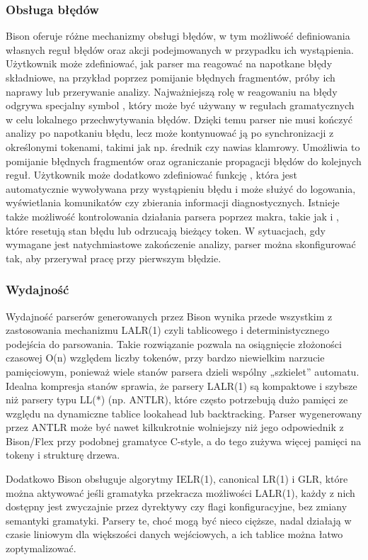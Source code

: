 \documentclass[12pt,twoside]{article}
\begin{document}
\subsubsection{Obsługa błędów}
Bison oferuje różne mechanizmy obsługi błędów, w tym możliwość definiowania własnych reguł błędów oraz akcji podejmowanych w przypadku ich wystąpienia. Użytkownik może zdefiniować, jak parser ma reagować na napotkane błędy składniowe, na przykład poprzez pomijanie błędnych fragmentów, próby ich naprawy lub przerywanie analizy.
Najważniejszą rolę w reagowaniu na błędy odgrywa specjalny symbol , który może być używany w regułach gramatycznych w celu lokalnego przechwytywania błędów. Dzięki temu parser nie musi kończyć analizy po napotkaniu błędu, lecz może kontynuować ją po synchronizacji z określonymi tokenami, takimi jak np. średnik czy nawias klamrowy. Umożliwia to pomijanie błędnych fragmentów oraz ograniczanie propagacji błędów do kolejnych reguł. Użytkownik może dodatkowo zdefiniować funkcję , która jest automatycznie wywoływana przy wystąpieniu błędu i może służyć do logowania, wyświetlania komunikatów czy zbierania informacji diagnostycznych. Istnieje także możliwość kontrolowania działania parsera poprzez makra, takie jak  i , które resetują stan błędu lub odrzucają bieżący token. W sytuacjach, gdy wymagane jest natychmiastowe zakończenie analizy, parser można skonfigurować tak, aby przerywał pracę przy pierwszym błędzie. 

\subsubsection{Wydajność}
Wydajność parserów generowanych przez Bison wynika przede wszystkim z zastosowania mechanizmu LALR(1) czyli tablicowego i deterministycznego podejścia do parsowania. Takie rozwiązanie pozwala na osiągnięcie złożoności czasowej O(n) względem liczby tokenów, przy bardzo niewielkim narzucie pamięciowym, ponieważ wiele stanów parsera dzieli wspólny „szkielet” automatu. Idealna kompresja stanów sprawia, że parsery LALR(1) są kompaktowe i szybsze niż parsery typu LL(*) (np. ANTLR), które często potrzebują dużo pamięci ze względu na dynamiczne tablice lookahead lub backtracking. Parser wygenerowany przez ANTLR może być nawet kilkukrotnie wolniejszy niż jego odpowiednik z Bison/Flex przy podobnej gramatyce C-style, a do tego zużywa więcej pamięci na tokeny i strukturę drzewa. 

Dodatkowo Bison obsługuje algorytmy IELR(1), canonical LR(1) i GLR, które można aktywować jeśli gramatyka przekracza możliwości LALR(1), każdy z nich dostępny  jest zwyczajnie przez dyrektywy  czy flagi konfiguracyjne, bez zmiany semantyki gramatyki. Parsery te, choć mogą być nieco cięższe, nadal działają w czasie liniowym dla większości danych wejściowych, a ich tablice można łatwo zoptymalizować. \cite{antlrVsLexYacc}
\end{document}
